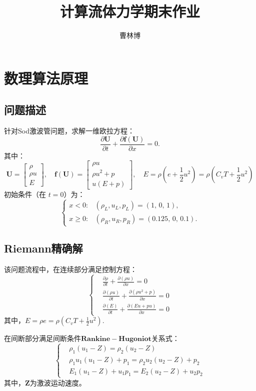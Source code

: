 \documentclass[12pt,a4paper]{article}%
\title{\fontsize{18pt}{27pt}\selectfont%
	{\heiti%
		计算流体力学期末作业}}%
\author{\fontsize{12pt}{18pt}\selectfont%
	{\fangsong%
		曹林博 \quad 2200011012}} %
\date{}%
\begin{document}
	\maketitle
	
	\section{数理算法原理}
		\subsection{问题描述}
		针对Sod激波管问题，求解一维欧拉方程：
		\[
		 	\frac{\partial \mathbf{U}}{\partial t} + \frac{\partial \mathbf{f}(\mathbf{U})}{\partial x} = 0.
		\]
		其中：
		\[
		\mathbf{U} = 
		\begin{bmatrix}
		 	\rho \\
		 	\rho u \\
		 	E
		\end{bmatrix}, \quad
		\mathbf{f}(\mathbf{U}) = 
		\begin{bmatrix}
		 	\rho u \\
		 	\rho u^2 + p \\
		 	u(E + p)
		\end{bmatrix}, \quad
		E = \rho (e + \frac12 u^2) = \rho \left( C_v T + \frac{1}{2} u^2 \right)
		\]
		初始条件（在 $t=0$）为：
		\[
		\begin{cases}
		 	x < 0: & (\rho_L, u_L, p_L) = (1,\, 0,\, 1), \\
		 	x \ge 0: & (\rho_R, u_R, p_R) = (0.125,\, 0,\, 0.1).
		\end{cases}
		\]
		
		\subsection{Riemann精确解}
		该问题流程中，在连续部分满足控制方程：
		\[
		\left\{
		\begin{aligned}
		 	&\frac{\partial \rho}{\partial t} + \frac{\partial (\rho u)}{\partial x} = 0 \\
		 	&\frac{\partial (\rho u)}{\partial t} + \frac{\partial (\rho u^2 + p)}{\partial x} = 0 \\
		 	&\frac{\partial (E)}{\partial t} + \frac{\partial (E u + p u)}{\partial x} = 0
		\end{aligned}
		\right.
		\]
		其中，$E = \rho e = \rho (C_v T + \frac{1}{2} u^2)$.
		
		在间断部分满足间断条件$\mathbf{Rankine-Hugoniot}$关系式：
		\[
		\left\{
		\begin{aligned}
		 	& \rho_1(u_1 - Z) = \rho_2(u_2 - Z) \\
		 	& \rho_1 u_1(u_1 - Z) + p_1 = \rho_2 u_2(u_2 - Z) + p_2 \\
		 	& E_1(u_1 - Z) + u_1 p_1 = E_2(u_2 - Z) + u_2 p_2
		\end{aligned}
		\right.
		\]
		其中，$\mathbf{Z}$为激波运动速度。
		
\end{document}

